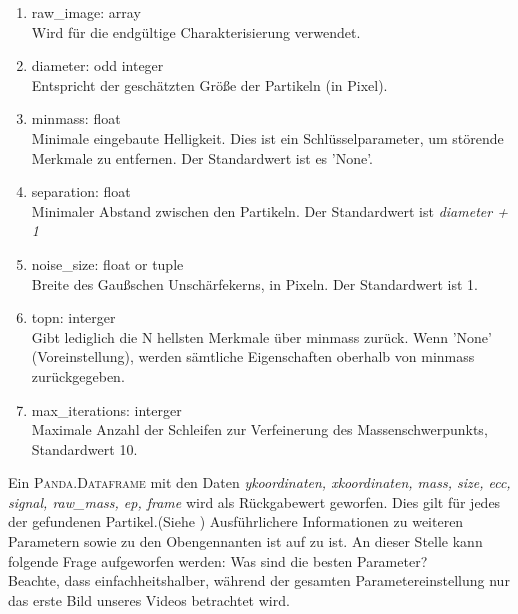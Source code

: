 		\begin{enumerate}
    			\item raw\_image: array \\
    			Wird für die endgültige Charakterisierung verwendet.
    			\item diameter: odd integer \\
    			Entspricht der geschätzten Größe der Partikeln (in Pixel).
    			\item minmass: float \\
    			Minimale eingebaute Helligkeit. Dies ist ein Schlüsselparameter, um störende 				Merkmale zu entfernen. Der Standardwert ist es 'None'.
    			\item separation: float\\
    			Minimaler Abstand zwischen den Partikeln. Der Standardwert ist \textit{diameter + 1}   			
    			\item noise\_size: float or tuple\\
    			Breite des Gaußschen Unschärfekerns, in Pixeln. Der Standardwert ist 1.
    			\item topn: interger\\
    			Gibt lediglich die N hellsten Merkmale über minmass zurück. Wenn 							'None' (Voreinstellung), werden sämtliche Eigenschaften oberhalb von minmass 				zurückgegeben.
    			\item max\_iterations: interger\\
    			Maximale Anzahl der Schleifen zur Verfeinerung des Massenschwerpunkts, 					Standardwert 10.
    			
		\end{enumerate}
		
Ein \textsc{Panda.Dataframe} mit den Daten \textit{y\-koordinaten, x\-koordinaten, mass, size, ecc, signal, raw\_mass, ep, frame} wird als Rückgabewert geworfen. Dies gilt für jedes der gefundenen Partikel.(Siehe )
Ausführlichere Informationen zu  weiteren Parametern sowie zu den Obengennanten ist auf zu ist.%
An dieser Stelle kann folgende Frage aufgeworfen werden: Was sind die besten Parameter? \\
Beachte, dass einfachheitshalber, während der gesamten Parametereinstellung nur das erste Bild unseres Videos betrachtet wird.

